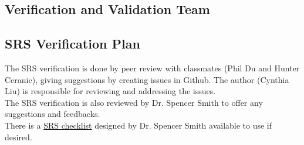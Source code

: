 \documentclass[12pt, titlepage]{article}
\begin{document}

\subsection{Verification and Validation Team}\label{VnVT}


\begin{table}[h]
\centering
{}
\caption{Verification and Validation Team}
\label{Table:VnVT}
\end{table}


\subsection{SRS Verification Plan}\label{SRSVP}
The SRS verification is done by peer review with classmates (Phil Du and Hunter Ceranic), giving suggestions by creating issues in Github. The author (Cynthia Liu) is responsible for reviewing and addressing the issues.\\
The SRS verification is also reviewed by Dr. Spencer Smith to offer any suggestions and feedbacks.\\
There is a \href{https://github.com/CynthiaLiu0805/BridgeCorrosion/blob/main/docs/Checklists/SRS-Checklist.pdf}{SRS checklist} designed by Dr. Spencer Smith available to use if desired.
\end{document}
